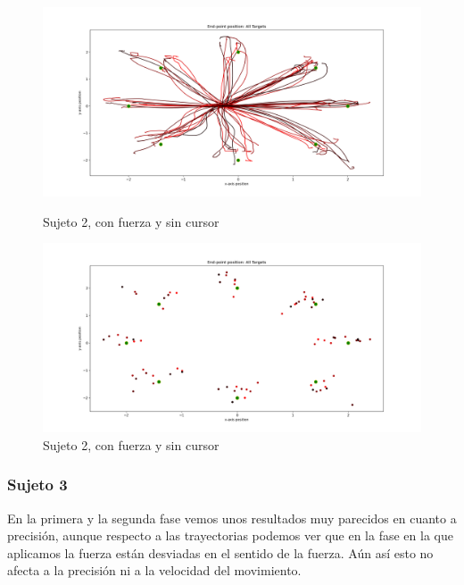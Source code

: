\documentclass[a4paper,11pt, oneside]{book}
\begin{document}
\begin{figure}[H]
	\begin{minipage}[b]{0.5\linewidth}
		\centering
		\includegraphics[width=\linewidth]{sujeto2/force_no_cursor/trayectorias}
		\caption{Sujeto 2, con fuerza y sin cursor}
		\label{fig:figura1}
	\end{minipage}
	\hspace{0.5cm}
	\begin{minipage}[b]{0.5\linewidth}
		\centering
		\includegraphics[width=\linewidth]{sujeto2/force_no_cursor/trayectorias_puntos}
		\caption{Sujeto 2, con fuerza y sin cursor}
		\label{fig:figura2}
	\end{minipage}
\end{figure}

\subsubsection{Sujeto 3}

En la primera y la segunda fase vemos unos resultados muy parecidos en cuanto a precisión, aunque respecto a las trayectorias podemos ver que en la fase en la que aplicamos la fuerza están desviadas en el sentido de la fuerza. Aún así esto no afecta a la precisión ni a la velocidad del movimiento.
\end{document}

